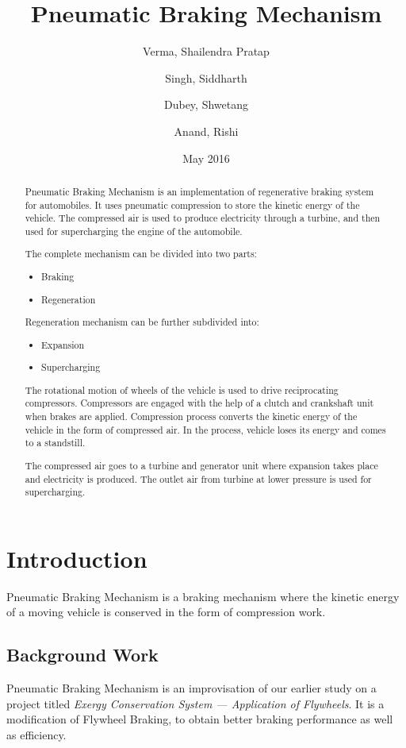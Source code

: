 \documentclass[12pt,a4paper]{article}
\title{Pneumatic Braking Mechanism}
\author{Verma, Shailendra Pratap \and Singh, Siddharth \and Dubey, Shwetang \and Anand, Rishi}
\date{May 2016}
\begin{document}
\maketitle

\begin{abstract}
	Pneumatic Braking Mechanism is an implementation of regenerative braking system for automobiles. It uses pneumatic compression to store the kinetic energy of the vehicle. The compressed air is used to produce electricity through a turbine, and then used for supercharging the engine of the automobile.

	The complete mechanism can be divided into two parts:

	\begin{itemize}
		\item Braking
		\item Regeneration
	\end{itemize}

	Regeneration mechanism can be further subdivided into:

	\begin{itemize}
		\item Expansion
		\item Supercharging
	\end{itemize}

	The rotational motion of wheels of the vehicle is used to drive reciprocating compressors. Compressors are engaged with the help of a clutch and crankshaft unit when brakes are applied. Compression process converts the kinetic energy of the vehicle in the form of compressed air. In the process, vehicle loses its energy and comes to a standstill.

	The compressed air goes to a turbine and generator unit where expansion takes place and electricity is produced. The outlet air from turbine at lower pressure is used for supercharging.
\end{abstract}

\section{Introduction}
	Pneumatic Braking Mechanism is a braking mechanism where the kinetic energy of a moving vehicle is conserved in the form of compression work.

	\subsection{Background Work}
		Pneumatic Braking Mechanism is an improvisation of our earlier study on a project titled \emph{Exergy Conservation System — Application of Flywheels}. It is a modification of Flywheel Braking, to obtain better braking performance as well as efficiency.
\end{document}
